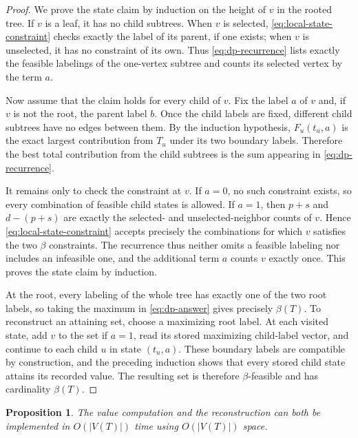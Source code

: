 \documentclass[11pt,a4paper]{article}
\newtheorem{proposition}[theorem]{Proposition}
\numberwithin{equation}{section}
\begin{document}
\begin{proof}
We prove the state claim by induction on the height of
\(v\) in the rooted tree. If \(v\) is a leaf, it has no child subtrees.
When \(v\) is selected, \eqref{eq:local-state-constraint} checks exactly the label of its parent, if
one exists; when \(v\) is unselected, it has no constraint of its own.
Thus \eqref{eq:dp-recurrence} lists exactly the feasible labelings of the one-vertex
subtree and counts its selected vertex by the term \(a\).

Now assume that the claim holds for every child of \(v\). Fix the label
\(a\) of \(v\) and, if \(v\) is not the root, the parent label \(b\).
Once the child labels are fixed, different child subtrees have no edges
between them. By the induction hypothesis, \(F_u(t_u,a)\) is the exact
largest contribution from \(T_u\) under its two boundary labels.
Therefore the best total contribution from the child subtrees is the sum
appearing in \eqref{eq:dp-recurrence}.

It remains only to check the constraint at \(v\). If \(a=0\), no such
constraint exists, so every combination of feasible child states is
allowed. If \(a=1\), then \(p+s\) and \(d-(p+s)\) are exactly the
selected- and unselected-neighbor counts of \(v\). Hence \eqref{eq:local-state-constraint} accepts
precisely the combinations for which \(v\) satisfies the two \(\beta\)
constraints. The recurrence thus neither omits a feasible labeling nor
includes an infeasible one, and the additional term \(a\) counts \(v\)
exactly once. This proves the state claim by induction.

At the root, every labeling of the whole tree has exactly one of the two
root labels, so taking the maximum in \eqref{eq:dp-answer} gives precisely
\(\beta(T)\). To reconstruct an attaining set, choose a maximizing root
label. At each visited state, add \(v\) to the set if \(a=1\), read its
stored maximizing child-label vector, and continue to each child \(u\)
in state \((t_u,a)\). These boundary labels are compatible by
construction, and the preceding induction shows that every stored child
state attains its recorded value. The resulting set is therefore
\(\beta\)-feasible and has cardinality \(\beta(T)\).
\end{proof}

\begin{proposition}\label{prop:dp-complexity}
The value computation and the reconstruction
can both be implemented in \(O(|V(T)|)\) time using \(O(|V(T)|)\) space.
\end{proposition}
\end{document}
